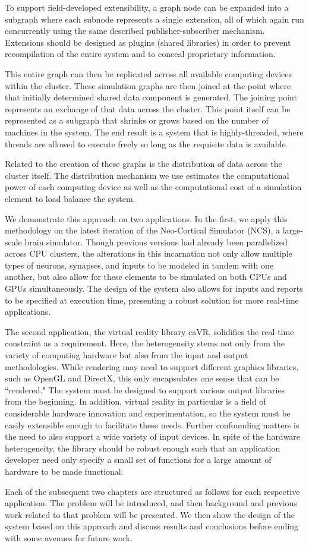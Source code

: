 To support field-developed extensibility, a graph node can be expanded
into a subgraph where each subnode represents a single extension, all of
which again run concurrently using the same described publisher-subscriber
mechanism. Extensions should be designed as plugins (shared libraries)
in order to prevent recompilation of the entire system and to conceal
proprietary information.

This entire graph can then be replicated across all available computing
devices within the cluster. These simulation graphs are then joined at
the point where that initially determined shared data component is generated.
The joining point represents an exchange of that data across the cluster. This
point itself can be represented as a subgraph that shrinks or grows based
on the number of machines in the system. The end result is a system that is
highly-threaded, where threads are allowed to execute freely so long as the
requisite data is available.

Related to the creation of these graphs is the distribution of data
across the cluster itself. The distribution mechanism we use estimates the
computational power of each computing device as well as the computational
cost of a simulation element to load balance the system.

We demonstrate this approach on two applications. In the first, we apply
this methodology on the latest iteration of the Neo-Cortical Simulator
(NCS), a large-scale brain simulator. Though previous versions had already
been parallelized across CPU clusters, the alterations in this incarnation
not only allow multiple types of neurons, synapses, and inputs to be
modeled in tandem with one another, but also allow for these elements to
be simulated on both CPUs and GPUs simultaneously.  The design of the
system also allows for inputs and reports to be specified at execution
time, presenting a robust solution for more real-time applications.

The second application, the virtual reality library caVR, solidifies the
real-time constraint as a requirement. Here, the heterogeneity stems not
only from the variety of computing hardware but also from the input and
output methodologies. While rendering may need to support different graphics
libraries, such as OpenGL and DirectX, this only encapsulates one sense
that can be ``rendered." The system must be designed to support various
output libraries from the beginning. In addition, virtual reality in particular
is a field of considerable hardware innovation and experimentation, so the
system must be easily extensible enough to facilitate these needs. Further
confounding matters is the need to also support a wide variety of input
devices. In spite of the hardware heterogeneity, the library should be
robust enough such that an application developer need only specify a small
set of functions for a large amount of hardware to be made functional.

Each of the subsequent two chapters are structured as follows for
each respective application. The problem will be introduced, and then
background and previous work related to that problem will be presented. We
then show the design of the system based on this approach and discuss
results and conclusions before ending with some avenues for future work.
